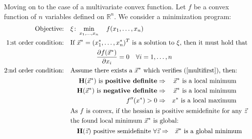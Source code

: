 \documentclass[../convex_optimization.tex]{subfiles}
\theoremstyle{definition} \newtheorem{defi}{Def}
\theoremstyle{definition} \newtheorem{prop}{Prop}
\begin{document}
Moving on to the case of a multivariate convex function.
Let $f$ be a convex function of $n$ variables defined on $\mathbb R^n$.
We consider a minimization program:
\begin{align}
    \text{Objective:} &\quad\xi\colon \min_{x_1,\ldots,x_n}
    \quad f(x_1, \ldots, x_n)
    \nonumber\\
    \text{1:st order condition:} &\quad
    \text{If $\vec{x}^*=(x_1^*, \ldots, x_n^*)^T$ is a solution to $\xi$,
    then it must hold that }
    \nonumber\\& \qquad \qquad \quad
    \begin{aligned}
        \frac{\partial f(\vec{x}^*)}{\partial x_i} = 0\label{multifirst}
        \quad \forall i=1,\ldots , n
    \end{aligned}\\
    \text{2:nd order condition:} &\quad
    \text{Assume there exists a $\vec{x}^*$ which verifies (\ref{multifirst}), then:}
    \nonumber\\ & \qquad
    \begin{aligned}
        \mathbf H(\vec{x}^*) \text{ is \textbf{positive definite}}
        &\Rightarrow & \vec{x}^*\text{ is a local minimum}\\
        \mathbf H(\vec{x}^*) \text{ is \textbf{negative definite}}
        &\Rightarrow & \vec{x}^*\text{ is a local minimum}\\
        f''(x^*) > 0 &\Rightarrow & x^* \text{ is a local maximum}
    \end{aligned}\\
    &\quad
    \text{As $f$ is convex, if the hessian is positive semidefinite for
any $\vec{z}$}\nonumber \\ & \quad
    \text{the found local minimum $\vec{x}^*$ is global:}
    \nonumber\\ & \qquad
    \begin{aligned}
        \mathbf H(\vec{z}) \text{ positive semidefinite } \forall \vec{z}
        & \Rightarrow & \vec{x}^*\text{ is a global minimum}
    \end{aligned}
\end{align}



\newpage
\end{document}
